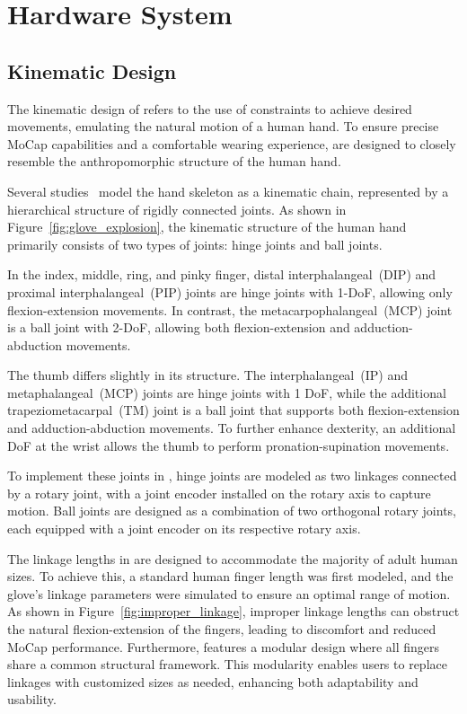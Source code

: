 \section{Hardware System}

\subsection{Kinematic Design}

The kinematic design of \oursystem refers to the use of constraints to achieve desired movements, emulating the natural motion of a human hand. 
%
To ensure precise MoCap capabilities and a comfortable wearing experience, \oursystem are designed to closely resemble the anthropomorphic structure of the human hand.

Several studies~\cite{cerulo2017teleoperation, cerveri2007finger} model the hand skeleton as a kinematic chain, represented by a hierarchical structure of rigidly connected joints. As shown in Figure~\ref{fig:glove_explosion}, the kinematic structure of the human hand primarily consists of two types of joints: hinge joints and ball joints.

In the index, middle, ring, and pinky finger, distal interphalangeal~(DIP) and proximal interphalangeal~(PIP) joints are hinge joints with 1-DoF, allowing only flexion-extension movements. In contrast, the metacarpophalangeal~(MCP) joint is a ball joint with 2-DoF, allowing both flexion-extension and adduction-abduction movements. 

The thumb differs slightly in its structure. The interphalangeal~(IP) and metaphalangeal~(MCP) joints are hinge joints with 1 DoF, while the additional trapeziometacarpal~(TM) joint is a ball joint that supports both flexion-extension and adduction-abduction movements. To further enhance dexterity, an additional DoF at the wrist allows the thumb to perform pronation-supination movements.

To implement these joints in \oursystem, hinge joints are modeled as two linkages connected by a rotary joint, with a joint encoder installed on the rotary axis to capture motion. Ball joints are designed as a combination of two orthogonal rotary joints, each equipped with a joint encoder on its respective rotary axis.



The linkage lengths in \oursystem are designed to accommodate the majority of adult human sizes. To achieve this, a standard human finger length was first modeled, and the glove's linkage parameters were simulated to ensure an optimal range of motion. As shown in Figure~\ref{fig:improper_linkage}, improper linkage lengths can obstruct the natural flexion-extension of the fingers, leading to discomfort and reduced MoCap performance. Furthermore, \oursystem features a modular design where all fingers share a common structural framework. This modularity enables users to replace linkages with customized sizes as needed, enhancing both adaptability and usability.


